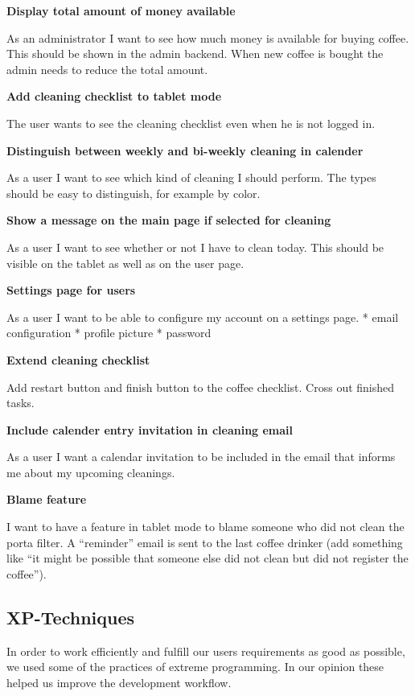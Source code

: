 \textbf{Display total amount of money available}

As an administrator I want to see how much money is available for buying
coffee. This should be shown in the admin backend. When new coffee is
bought the admin needs to reduce the total amount.

\textbf{Add cleaning checklist to tablet mode}

The user wants to see the cleaning checklist even when he is not logged
in.

\textbf{Distinguish between weekly and bi-weekly cleaning in calender}

As a user I want to see which kind of cleaning I should perform. The
types should be easy to distinguish, for example by color.

\textbf{Show a message on the main page if selected for cleaning}

As a user I want to see whether or not I have to clean today. This
should be visible on the tablet as well as on the user page.

\textbf{Settings page for users}

As a user I want to be able to configure my account on a settings page.
* email configuration * profile picture * password

\textbf{Extend cleaning checklist}

Add restart button and finish button to the coffee checklist. Cross out
finished tasks.

\textbf{Include calender entry invitation in cleaning email}

As a user I want a calendar invitation to be included in the email that
informs me about my upcoming cleanings.

\textbf{Blame feature}

I want to have a feature in tablet mode to blame someone who did not
clean the porta filter. A ``reminder'' email is sent to the last coffee
drinker (add something like ``it might be possible that someone else did
not clean but did not register the coffee'').

\subsection{XP-Techniques}\label{xp-techniques}

In order to work efficiently and fulfill our users requirements as good
as possible, we used some of the practices of extreme programming. In
our opinion these helped us improve the development workflow.

